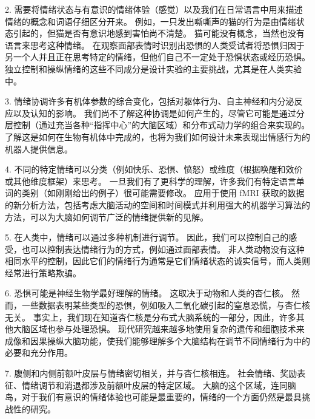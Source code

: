 2. 需要将情绪状态与有意识的情绪体验（感觉）以及我们在日常语言中用来描述情绪的概念和词语仔细区分开来。 例如，一只发出嘶嘶声的猫的行为是由情绪状态引起的，但猫是否有意识地感到害怕尚不清楚。 猫可能没有概念，当然也没有语言来思考这种情绪。 在观察面部表情时识别出恐惧的人类受试者将恐惧归因于另一个人并且正在思考特定的情绪，但他们自己不一定处于恐惧状态或经历恐惧。 独立控制和操纵情绪的这些不同成分是设计实验的主要挑战，尤其是在人类实验中。 

3. 情绪协调许多有机体参数的综合变化，包括对躯体行为、自主神经和内分泌反应以及认知的影响。 我们尚不了解这种协调是如何产生的，尽管它可能是通过分层控制（通过充当各种“指挥中心”的大脑区域）和分布式动力学的组合来实现的。 了解这是如何在生物有机体中完成的，也将为我们如何设计未来表现出情感行为的机器人提供信息。 

4. 不同的特定情绪可以分类（例如快乐、恐惧、愤怒）或维度（根据唤醒和效价或其他维度框架）来思考。 一旦我们有了更科学的理解，许多我们有特定语言单词的类别（如刚刚给出的例子）很可能需要修改。 应用于使用 fMRI 获取的数据的新分析方法，包括考虑大脑活动的空间和时间模式并利用强大的机器学习算法的方法，可以为大脑如何调节广泛的情绪提供新的见解。 

5. 在人类中，情绪可以通过多种机制进行调节。 因此，我们可以控制自己的感受，也可以控制表达情绪行为的方式，例如通过面部表情。 非人类动物没有这种相同水平的控制，因此它们的情绪行为通常是它们情绪状态的诚实信号，而人类则经常进行策略欺骗。 

6. 恐惧可能是神经生物学最好理解的情绪。 这取决于动物和人类的杏仁核。 然而，一些数据表明某些类型的恐惧，例如吸入二氧化碳引起的窒息恐慌，与杏仁核无关。 事实上，我们现在知道杏仁核是分布式大脑系统的一部分，因此，许多其他大脑区域也参与处理恐惧。 现代研究越来越多地使用复杂的遗传和细胞技术来成像和因果操纵大脑功能，使我们能够理解多个大脑结构在调节不同情绪行为中的必要和充分作用。 

7. 腹侧和内侧前额叶皮层与情绪密切相关，并与杏仁核相连。 社会情绪、奖励表征、情绪调节和消退都涉及前额叶皮层的特定区域。 大脑的这个区域，连同脑岛，对于我们有意识的情绪体验也可能是最重要的，情绪的一个方面仍然是最具挑战性的研究。

